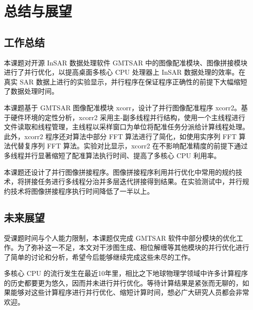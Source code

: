 \chapter{总结与展望}

\section{工作总结}

本课题对开源 InSAR 数据处理软件 GMTSAR 中的图像配准模块、图像拼接模块进行了并行优化，以提高桌面多核心 CPU 处理器上 InSAR 数据处理的效率。在真实 SAR 数据上进行的实验显示，并行程序在保证程序正确性的前提下大幅缩短了数据处理时间。

本课题基于 GMTSAR 图像配准模块 xcorr，设计了并行图像配准程序 xcorr2。基于硬件环境的定性分析，xcorr2 采用主-副多线程并行结构，使用一个主线程进行文件读取和线程管理，主线程以采样窗口为单位将配准任务分派给计算线程处理。此外，xcorr2 程序还对算法中部分 FFT 算法进行了简化，如使用实序列 FFT 算法代替复序列 FFT 算法。实验对比显示，xcorr2 在不影响配准精度的前提下通过多线程并行显著缩短了配准算法执行时间、提高了多核心 CPU 利用率。

本课题还设计了并行图像拼接程序。图像拼接程序利用并行优化中常用的规约技术，将拼接任务进行多线程分治并多层迭代拼接得到结果。在实验测试中，并行规约技术将图像拼接程序执行时间降低了一半以上。

\section{未来展望}

受课题时间与个人能力限制，本课题仅完成 GMTSAR 软件中部分模块的优化工作。为了弥补这一不足，本文对干涉图生成、相位解缠等其他模块的并行优化进行了简单的讨论和分析，希望今后能够继续完成这些未尽的工作。

多核心 CPU 的流行发生在最近10年里，相比之下地球物理学领域中许多计算程序的历史都要更为悠久，因而并未进行并行优化。等待计算结果是紧张而无聊的，如果能够对这些计算程序进行并行优化、缩短计算时间，想必广大研究人员都会非常欢迎。

